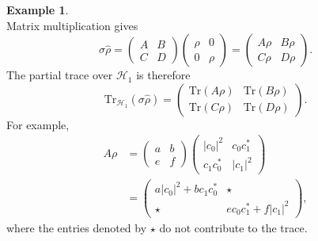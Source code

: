 \documentclass[
    aps,
    pra,
    reprint,
    superscriptaddress,
    nofootinbib
]{revtex4-2}
\theoremstyle{definition}
\newtheorem{example}{Example}[section]
\theoremstyle{plain}
\begin{document}
\begin{example}
\begin{equation}
    \end{equation}
    Matrix multiplication gives
    \begin{equation}
        \sigma\hat{\rho}
        =
        \begin{pmatrix}
            A&B\\
            C&D
        \end{pmatrix}
        \begin{pmatrix}
            \rho&0\\
            0&\rho
        \end{pmatrix}
        =
        \begin{pmatrix}
            A\rho&B\rho\\
            C\rho&D\rho
        \end{pmatrix}.
    \end{equation}
    The partial trace over $\mathcal{H}_{1}$ is therefore
    \begin{equation}
        \mathrm{Tr}_{\mathcal{H}_{1}}(\sigma\hat{\rho})
        =
        \begin{pmatrix}
            \mathrm{Tr}(A\rho)&\mathrm{Tr}(B\rho)\\
            \mathrm{Tr}(C\rho)&\mathrm{Tr}(D\rho)
        \end{pmatrix}.
        \label{eq:pt}
    \end{equation}
    For example,
    \begin{equation}
        \begin{aligned}
        A\rho
        &=
        \begin{pmatrix}
            a&b\\
            e&f
        \end{pmatrix}
        \begin{pmatrix}
            |c_{0}|^{2}&c_{0}c_{1}^{*}\\
            c_{1}c_{0}^{*}&|c_{1}|^{2}
        \end{pmatrix}\\
        &=
        \begin{pmatrix}
            a|c_{0}|^{2}+bc_{1}c_{0}^{*}&\star\\
            \star&ec_{0}c_{1}^{*}+f|c_{1}|^{2}
        \end{pmatrix},
        \end{aligned}
    \end{equation}
    where the entries denoted by $\star$ do not contribute to the
    trace.


\end{example}
\end{document}
